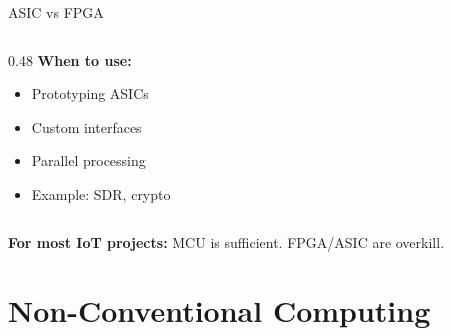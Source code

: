 \documentclass[aspectratio=169,11pt]{beamer}
\begin{document}
\begin{frame}{ASIC vs FPGA}
\begin{columns}[T]
\begin{column}{0.48\textwidth}
            \vspace{0.2cm}
            \textbf{When to use:}
            \begin{itemize}
                \item Prototyping ASICs
                \item Custom interfaces
                \item Parallel processing
                \item Example: SDR, crypto
            \end{itemize}
        \end{column}
    \end{columns}
    
    \vspace{0.3cm}
    \textbf{For most IoT projects:} MCU is sufficient. FPGA/ASIC are overkill.
\end{frame}

\section{Non-Conventional Computing}
\end{document}
